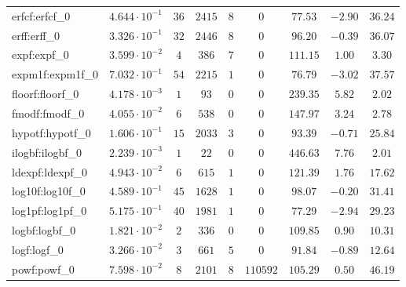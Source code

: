 \begin{tabular}{|l|c|c|c|c|c|c|c|c|}
erfcf:erfcf\_0               & $ 4.644 \cdot 10^{-1} $ & $ 36     $ & $ 2415  $ & $ 8   $ & $ 0      $ & $ 77.53       $ & $ -2.90   $ & $ 36.24   $ \\
erff:erff\_0                 & $ 3.326 \cdot 10^{-1} $ & $ 32     $ & $ 2446  $ & $ 8   $ & $ 0      $ & $ 96.20       $ & $ -0.39   $ & $ 36.07   $ \\
expf:expf\_0                 & $ 3.599 \cdot 10^{-2} $ & $ 4      $ & $ 386   $ & $ 7   $ & $ 0      $ & $ 111.15      $ & $ 1.00    $ & $ 3.30    $ \\
expm1f:expm1f\_0             & $ 7.032 \cdot 10^{-1} $ & $ 54     $ & $ 2215  $ & $ 1   $ & $ 0      $ & $ 76.79       $ & $ -3.02   $ & $ 37.57   $ \\
floorf:floorf\_0             & $ 4.178 \cdot 10^{-3} $ & $ 1      $ & $ 93    $ & $ 0   $ & $ 0      $ & $ 239.35      $ & $ 5.82    $ & $ 2.02    $ \\
fmodf:fmodf\_0               & $ 4.055 \cdot 10^{-2} $ & $ 6      $ & $ 538   $ & $ 0   $ & $ 0      $ & $ 147.97      $ & $ 3.24    $ & $ 2.78    $ \\
hypotf:hypotf\_0             & $ 1.606 \cdot 10^{-1} $ & $ 15     $ & $ 2033  $ & $ 3   $ & $ 0      $ & $ 93.39       $ & $ -0.71   $ & $ 25.84   $ \\
ilogbf:ilogbf\_0             & $ 2.239 \cdot 10^{-3} $ & $ 1      $ & $ 22    $ & $ 0   $ & $ 0      $ & $ 446.63      $ & $ 7.76    $ & $ 2.01    $ \\
ldexpf:ldexpf\_0             & $ 4.943 \cdot 10^{-2} $ & $ 6      $ & $ 615   $ & $ 1   $ & $ 0      $ & $ 121.39      $ & $ 1.76    $ & $ 17.62   $ \\
log10f:log10f\_0             & $ 4.589 \cdot 10^{-1} $ & $ 45     $ & $ 1628  $ & $ 1   $ & $ 0      $ & $ 98.07       $ & $ -0.20   $ & $ 31.41   $ \\
log1pf:log1pf\_0             & $ 5.175 \cdot 10^{-1} $ & $ 40     $ & $ 1981  $ & $ 1   $ & $ 0      $ & $ 77.29       $ & $ -2.94   $ & $ 29.23   $ \\
logbf:logbf\_0               & $ 1.821 \cdot 10^{-2} $ & $ 2      $ & $ 336   $ & $ 0   $ & $ 0      $ & $ 109.85      $ & $ 0.90    $ & $ 10.31   $ \\
logf:logf\_0                 & $ 3.266 \cdot 10^{-2} $ & $ 3      $ & $ 661   $ & $ 5   $ & $ 0      $ & $ 91.84       $ & $ -0.89   $ & $ 12.64   $ \\
powf:powf\_0                 & $ 7.598 \cdot 10^{-2} $ & $ 8      $ & $ 2101  $ & $ 8   $ & $ 110592 $ & $ 105.29      $ & $ 0.50    $ & $ 46.19   $ \\

\end{tabular}
